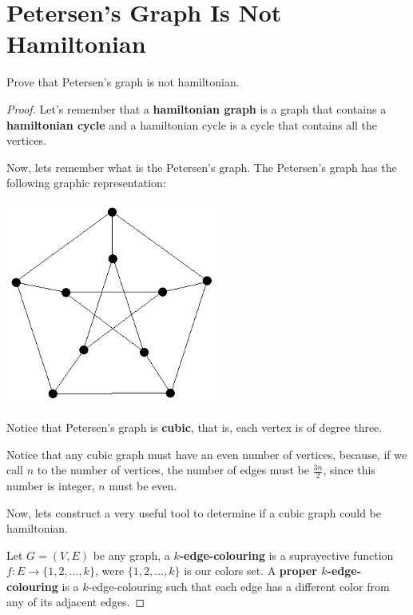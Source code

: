 ﻿\chapter{Petersen's Graph Is Not Hamiltonian}

    \begin{theorem}
        Prove that Petersen's graph is not hamiltonian.
    \end{theorem}
    
    \begin{proof}
        Let's remember that a \textbf{hamiltonian graph} is a graph that contains a \textbf{hamiltonian cycle} and a hamiltonian cycle is
        a cycle that contains all the vertices.\pn
        
        Now, lets remember what is the Petersen's graph. The Petersen's graph has the following graphic representation:
        \begin{center}
            \includegraphics[width=7cm]{PetersenIsNotHamiltonian/Petersen1.png}    
        \end{center}\pn
        
        Notice that Petersen's graph is \textbf{cubic}, that is, each vertex is of degree three.\pn 

        Notice that any cubic graph must have an even number of vertices, because, if we call $n$ to the number of vertices, 
        the number of edges must be $\frac{3n}{2}$, since this number is integer, $n$ must be even.\pn
        
        Now, lets construct a very useful tool to determine if a cubic graph could be hamiltonian.\pn 
        
        Let $G = (V, E)$ be any graph, a \textbf{$k$-edge-colouring} is a suprayective function $f : E \longrightarrow \{1, 2, \dots, k\}$, 
        were $\{1, 2, \dots, k\}$ is our colors set. A \textbf{proper $k$-edge-colouring} is a $k$-edge-colouring such that each edge has a 
        different color from any of its adjacent edges.\pn
               

\end{proof}
